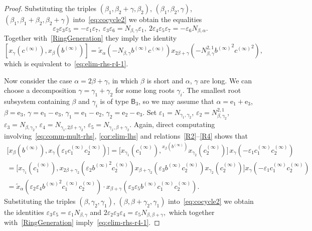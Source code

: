 \documentclass[oneside, 11pt]{amsart}
\numberwithin{equation}{section}
\theoremstyle{definition}
\theoremstyle{remark}
\newcommand{\up}[2]{{^{#1}\!{#2}}}
\newcommand{\rB}{\mathsf{B}}
\begin{document}
\begin{proof}
Substituting the triples $(\beta_1, \beta_2+\gamma, \beta_2)$, $(\beta_1, \beta_2, \gamma)$, $(\beta_1, \beta_1+\beta_2, \beta_2+\gamma)$ into~\eqref{eq:cocycle2} we obtain the equalities \[\varepsilon_2 \varepsilon_3 \varepsilon_5 = - \varepsilon_1 \varepsilon_7,\ \varepsilon_3 \varepsilon_6  = N_{\beta, \gamma}\varepsilon_1,\ 2 \varepsilon_4 \varepsilon_5 \varepsilon_7 = - \varepsilon_6 N_{\beta,\alpha}.\] Together with~\cref{RingGeneration} they imply the identity \[[x_\gamma(c^{(\infty)}), x_\beta(b^{(\infty)})] = 
 \widetilde{x}_\alpha(-N_{\beta, \gamma} b^{(\infty)} c^{(\infty)}) x_{2\beta+\gamma}(-N_{\beta,\gamma}^{2,1} {b^{(\infty)}}^2 {c^{(\infty)}}^2),\] which is equivalent to~\eqref{eq:elim-rhs-r4-1}. 
 
 Now consider the case \(\alpha = 2\beta + \gamma\), in which \(\beta\) is short and \(\alpha\), \(\gamma\) are long. We can choose a decomposition \(\gamma = \gamma_1 + \gamma_2\) for some long roots \(\gamma_i\). The smallest root subsystem containing \(\beta\) and \(\gamma_i\) is of type \(\rB_3\), so we may assume that \(\alpha = \mathrm e_1 + \mathrm e_3\), \(\beta = \mathrm e_3\), \(\gamma = \mathrm e_1 - \mathrm e_3\), \(\gamma_1 = \mathrm e_1 - \mathrm e_2\), \(\gamma_2 = \mathrm e_2 - \mathrm e_3\). Set $\varepsilon_1 = N_{\gamma_1, \gamma_2}$, $\varepsilon_2 = N_{\beta,\gamma_2}^{2,1}$, $\varepsilon_3 = N_{\beta,\gamma_2}$, $\varepsilon_4 = N_{\gamma_1, 2\beta+\gamma_2}$, $\varepsilon_5 = N_{\gamma_1, \beta+\gamma_2}$.
 Again, direct computating involving~\eqref{eq:comm-mult-rhs}, \cref{cor:elim-lhs} and relations~\eqref{R2}--\eqref{R4} shows that
 \begin{multline*}
  \bigl[x_\beta(b^{(\infty)}), x_\gamma(\varepsilon_1 c_1^{(\infty)} c_2^{(\infty)})\bigr]
   =  \bigl[x_{\gamma_1}(c_1^{(\infty)}), \up{x_\beta(b^{(\infty)})} {x_{\gamma_2}(c_2^{(\infty)})}\bigr]\,
  x_\gamma(-\varepsilon_1 c_1^{(\infty)} c_2^{(\infty)}) \\  
  = \bigl[x_{\gamma_1}(c_1^{(\infty)}), x_{2\beta+\gamma_2}(\varepsilon_2 {b^{(\infty)}}^2 c_2^{(\infty)}) x_{\beta+\gamma_2}(\varepsilon_3 b^{(\infty)} c_2^{(\infty)}) x_{\gamma_2}(c_2^{(\infty)})\bigr] x_\gamma(-\varepsilon_1 c_1^{(\infty)} c_2^{(\infty)}) \\
  = \widetilde{x}_\alpha( \varepsilon_2 \varepsilon_4 {b^{(\infty)}}^2 c_1^{(\infty)}c_2^{(\infty)}) \cdot x_{\beta+\gamma}(\varepsilon_3 \varepsilon_5 b^{(\infty)} c_1^{(\infty)}c_2^{(\infty)}). \end{multline*}
 Substituting the triples $(\beta, \gamma_2, \gamma_1)$, $(\beta, \beta+\gamma_2, \gamma_1)$ into~\eqref{eq:cocycle2} we obtain the identities $\varepsilon_3 \varepsilon_5 = \varepsilon_1 N_{\beta,\gamma}$ and
 $2\varepsilon_2\varepsilon_3 \varepsilon_4 = \varepsilon_5N_{\beta,\beta+\gamma},$ which together with~\cref{RingGeneration} imply~\eqref{eq:elim-rhs-r4-1}. \end{proof}
\end{document}

